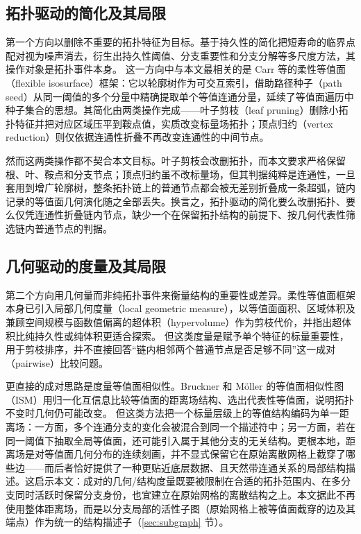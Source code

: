 \documentclass[twocolumn, a4paper, 10pt]{article}
\begin{document}
\subsection{拓扑驱动的简化及其局限}

第一个方向以删除不重要的拓扑特征为目标。基于持久性的简化把短寿命的临界点配对视为噪声消去，衍生出持久性阈值、分支重要性和分支分解等多尺度方法，其操作对象是拓扑事件本身。\cite{edelsbrunner_persistence_2002,carr_geometric_2004} 这一方向中与本文最相关的是 Carr 等的柔性等值面（flexible isosurface）框架\cite{carr_flexible_2010}：它以轮廓树作为可交互索引\cite{carr_contour_2003}，借助路径种子（path seed）从同一阈值的多个分量中精确提取单个等值连通分量，延续了等值面遍历中种子集合的思想\cite{van_kreveld_1997}。其简化由两类操作完成——叶子剪枝（leaf pruning）删除小拓扑特征并把对应区域压平到鞍点值，实质改变标量场拓扑；顶点归约（vertex reduction）则仅依据连通性折叠不再改变连通性的中间节点。

然而这两类操作都不契合本文目标。叶子剪枝会改删拓扑，而本文要求严格保留根、叶、鞍点和分支节点；顶点归约虽不改标量场，但其判据纯粹是连通性，一旦套用到增广轮廓树，整条拓扑链上的普通节点都会被无差别折叠成一条超弧，链内记录的等值面几何演化随之全部丢失。换言之，拓扑驱动的简化要么改删拓扑、要么仅凭连通性折叠链内节点，缺少一个在保留拓扑结构的前提下、按几何代表性筛选链内普通节点的判据。

\subsection{几何驱动的度量及其局限}

第二个方向用几何量而非纯拓扑事件来衡量结构的重要性或差异。柔性等值面框架本身已引入局部几何度量（local geometric measure），以等值面面积、区域体积及兼顾空间规模与函数值偏离的超体积（hypervolume）作为剪枝代价，并指出超体积比纯持久性或纯体积更适合探索。\cite{carr_geometric_2004,carr_flexible_2010} 但这类度量是赋予单个特征的标量重要性，用于剪枝排序，并不直接回答“链内相邻两个普通节点是否足够不同”这一成对（pairwise）比较问题。

更直接的成对思路是度量等值面相似性。Bruckner 和 Möller 的等值面相似性图（ISM）用归一化互信息比较等值面的距离场结构、选出代表性等值面，说明拓扑不变时几何仍可能改变。\cite{bruckner_ism_2010} 但这类方法把一个标量层级上的等值结构编码为单一距离场：一方面，多个连通分支的变化会被混合到同一个描述符中；另一方面，若在同一阈值下抽取全局等值面，还可能引入属于其他分支的无关结构。更根本地，距离场是对等值面几何分布的连续刻画，并不显式保留它在原始离散网格上截穿了哪些边——而后者恰好提供了一种更贴近底层数据、且天然带连通关系的局部结构描述。这启示本文：成对的几何/结构度量既要被限制在合适的拓扑范围内、在多分支同时活跃时保留分支身份，也宜建立在原始网格的离散结构之上。本文据此不再使用整体距离场，而是以分支局部的活性子图（原始网格上被等值面截穿的边及其端点）作为统一的结构描述子（\ref{sec:subgraph} 节）。
\end{document}
